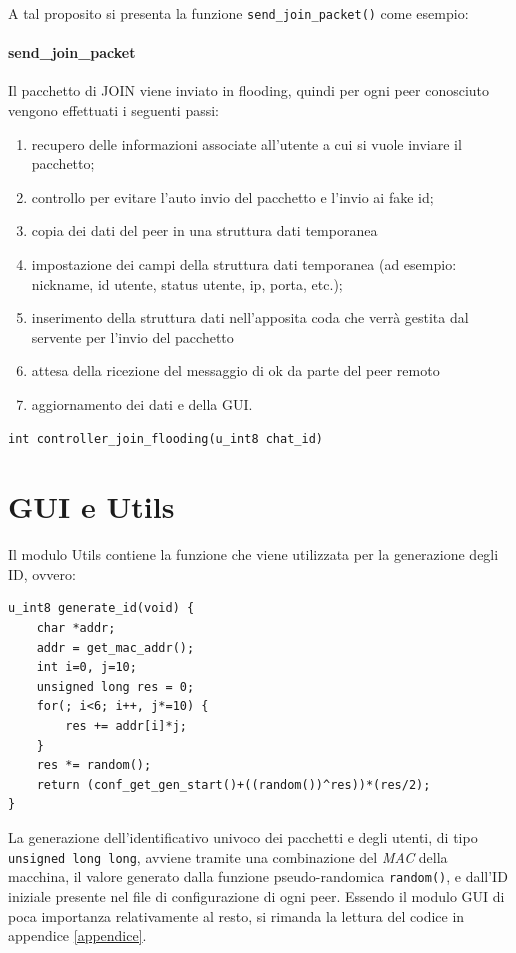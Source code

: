 A tal proposito si presenta la funzione \texttt{send\_join\_packet()} come esempio:
\paragraph{send\_join\_packet}
Il pacchetto di JOIN viene inviato in flooding, quindi per ogni peer conosciuto vengono effettuati i seguenti passi:
\begin{enumerate}
\item recupero delle informazioni associate all'utente a cui si vuole inviare il pacchetto;
\item controllo per evitare l'auto invio del pacchetto e l'invio ai fake id;
\item copia dei dati del peer in una struttura dati temporanea
\item impostazione dei campi della struttura dati temporanea (ad esempio: nickname, id utente, status utente, ip, porta, etc.);
\item inserimento della struttura dati nell'apposita coda che verrà gestita dal servente per l'invio del pacchetto
\item attesa della ricezione del messaggio di ok da parte del peer remoto
\item aggiornamento dei dati e della GUI.
\end{enumerate}
\begin{lstlisting}
int controller_join_flooding(u_int8 chat_id)
\end{lstlisting}
\section{GUI e Utils}
Il modulo Utils contiene la funzione che viene utilizzata per la generazione degli ID, ovvero:
\begin{lstlisting}[]
u_int8 generate_id(void) {
	char *addr;
	addr = get_mac_addr();
	int i=0, j=10;
	unsigned long res = 0;
	for(; i<6; i++, j*=10) {
		res += addr[i]*j;
	}
	res *= random();
	return (conf_get_gen_start()+((random())^res))*(res/2);
}
\end{lstlisting}
La generazione dell'identificativo univoco dei pacchetti e degli utenti, di tipo \texttt{unsigned long long}, avviene tramite una combinazione del \textit{MAC} della macchina, il valore generato dalla funzione pseudo-randomica \texttt{random()}, e dall'ID iniziale presente nel file di configurazione di ogni peer.
Essendo il modulo GUI di poca importanza relativamente al resto, si rimanda la lettura del codice in appendice \ref{appendice}.
